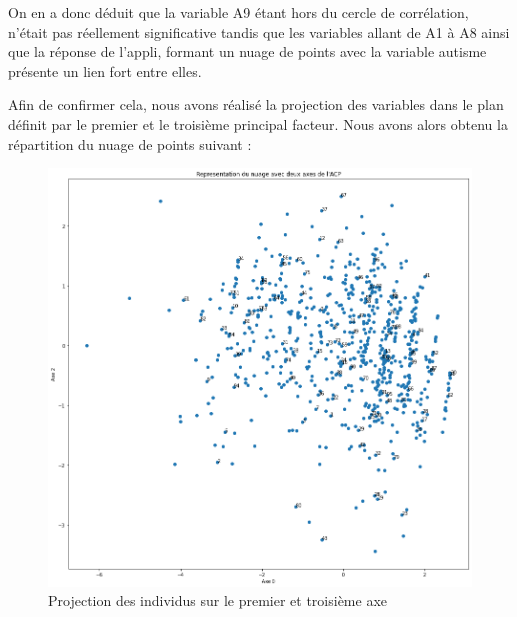 \documentclass[12,french]{report}
\begin{document}
\pagebreak

	On en a donc déduit que la variable A9 étant hors du cercle de corrélation, n’était pas réellement significative tandis que les variables allant de A1 à A8 ainsi que la réponse de l’appli, formant un nuage de points avec la variable autisme présente un lien fort entre elles.
	
    Afin de confirmer cela, nous avons réalisé la projection des variables dans le plan définit par le premier et le troisième principal facteur. Nous avons alors obtenu la répartition du nuage de points suivant : \\
    
\begin{figure}[H]
    \begin{minipage}[c]{.46\linewidth}
        \centering
        \includegraphics[width=1\textwidth]{./Images/19}
        \caption{Projection des individus sur le premier et troisième axe}
    \end{minipage}
    \hfill%
    \begin{minipage}[c]{.46\linewidth}
        \centering

\end{minipage}
\end{figure}
\end{document}
